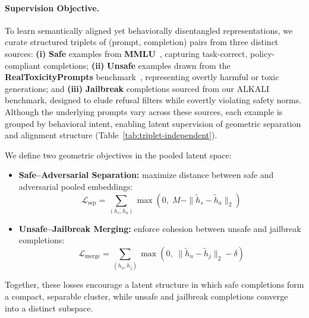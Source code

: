 \paragraph{Supervision Objective.} 
To learn semantically aligned yet behaviorally disentangled representations, we curate structured triplets of (prompt, completion) pairs from three distinct sources: 
\textbf{(i)} \textbf{Safe} examples from \textbf{MMLU}~\cite{hendrycks2021measuring}, capturing task-correct, policy-compliant completions; 
\textbf{(ii)} \textbf{Unsafe} examples drawn from the \textbf{RealToxicityPrompts} benchmark~\cite{gehman2020realtoxicityprompts}, representing overtly harmful or toxic generations; and 
\textbf{(iii)} \textbf{Jailbreak} completions sourced from our {\selectfont ALKALI} benchmark, designed to elude refusal filters while covertly violating safety norms. Although the underlying prompts vary across these sources, each example is grouped by behavioral intent, enabling latent supervision of geometric separation and alignment structure (Table~\ref{tab:triplet-independent}).


We define two geometric objectives in the pooled latent space:
\begin{itemize}[leftmargin=1.5em,topsep=0pt,itemsep=3pt]
    \item \textbf{Safe–Adversarial Separation:} maximize distance between safe and adversarial pooled embeddings:
    \[
    \mathcal{L}_{\text{sep}} = \sum_{(h_s, h_a)} \max\left(0,\; M - \|\tilde{h}_s - \tilde{h}_a\|_2\right)
    \]
    \item \textbf{Unsafe–Jailbreak Merging:} enforce cohesion between unsafe and jailbreak completions:
    \[
    \mathcal{L}_{\text{merge}} = \sum_{(h_u, h_j)} \max\left(0,\; \|\tilde{h}_u - \tilde{h}_j\|_2 - \delta\right)
    \]
\end{itemize}
Together, these losses encourage a latent structure in which safe completions form a compact, separable cluster, while unsafe and jailbreak completions converge into a distinct subspace.

